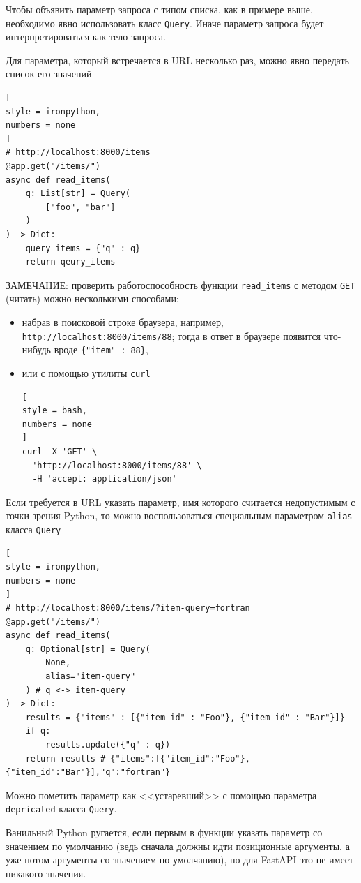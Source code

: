 \documentclass[%
	11pt,
	a4paper,
	utf8,
		]{article}
\begin{document}
Чтобы объявить параметр запроса с типом списка, как в примере выше, необходимо явно использовать класс \texttt{Query}. Иначе параметр запроса будет интерпретироваться как тело запроса.

Для параметра, который встречается в URL несколько раз, можно явно передать список его значений
\begin{lstlisting}[
style = ironpython,
numbers = none
]
# http://localhost:8000/items
@app.get("/items/")
async def read_items(
    q: List[str] = Query(
        ["foo", "bar"]
    )
) -> Dict:
    query_items = {"q" : q}
    return qeury_items
\end{lstlisting}

ЗАМЕЧАНИЕ: проверить работоспособность функции \texttt{read\_items} с методом \texttt{GET} (читать) можно несколькими способами:
\begin{itemize}
	\item набрав в поисковой строке браузера, например, \texttt{http://localhost:8000/items/88}; тогда в ответ в браузере появится что-нибудь вроде \verb|{"item" : 88}|,
	
	\item или с помощью утилиты \texttt{curl}
\begin{lstlisting}[
style = bash,
numbers = none	
]
curl -X 'GET' \
  'http://localhost:8000/items/88' \
  -H 'accept: application/json'
\end{lstlisting}
\end{itemize}

Если требуется в URL указать параметр, имя которого считается недопустимым с точки зрения Python, то можно воспользоваться специальным параметром \texttt{alias} класса \texttt{Query}
\begin{lstlisting}[
style = ironpython,
numbers = none	
]
# http://localhost:8000/items/?item-query=fortran
@app.get("/items/")
async def read_items(
    q: Optional[str] = Query(
        None,
        alias="item-query"
    ) # q <-> item-query
) -> Dict:
    results = {"items" : [{"item_id" : "Foo"}, {"item_id" : "Bar"}]}
    if q: 
        results.update({"q" : q})
    return results # {"items":[{"item_id":"Foo"},{"item_id":"Bar"}],"q":"fortran"}
\end{lstlisting}

Можно пометить параметр как <<устаревший>> с помощью параметра \texttt{depricated} класса \texttt{Query}.

Ванильный Python ругается, если первым в функции указать параметр со значением по умолчанию (ведь сначала должны идти позиционные аргументы, а уже потом аргументы со значением по умолчанию), но для FastAPI это не имеет никакого значения.
\end{document}
